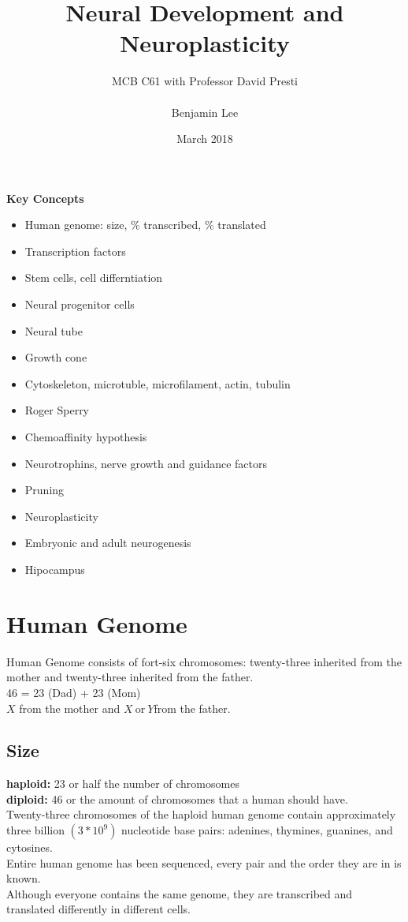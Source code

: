 \documentclass{article}
\title{Neural Development and Neuroplasticity}
\author{MCB C61 with Professor David Presti \\ \\ Benjamin Lee}
\date{March 2018}
\begin{document}
\maketitle

\textbf{Key Concepts}
\begin{itemize}
    \item Human genome: size, \% transcribed, \% translated
    \item Transcription factors
    \item Stem cells, cell differntiation
    \item Neural progenitor cells
    \item Neural tube
    \item Growth cone
    \item Cytoskeleton, microtuble, microfilament, actin, tubulin
    \item Roger Sperry
    \item Chemoaffinity hypothesis
    \item Neurotrophins, nerve growth and guidance factors
    \item Pruning 
    \item Neuroplasticity
    \item Embryonic and adult neurogenesis
    \item Hipocampus
\end{itemize}
\newpage

\section{Human Genome}
Human Genome consists of fort-six chromosomes: twenty-three inherited from the mother and twenty-three inherited from the father. \\
46 = 23 (Dad) + 23 (Mom) \\ 
$X$ from the mother and $X \ \text{or} \ Y $from the father. \\
\subsection{Size}
\textbf{haploid:} 23 or half the number of chromosomes \\
\textbf{diploid:} 46 or the amount of chromosomes that a human should have. \\
Twenty-three chromosomes of the haploid human genome contain approximately three billion $(3  *  10^9)$ nucleotide base pairs: adenines, thymines, guanines, and cytosines. \\
Entire human genome has been sequenced, every pair and the order they are in is known. \\
Although everyone contains the same genome, they are transcribed and translated differently in different cells. \\
\end{document}
